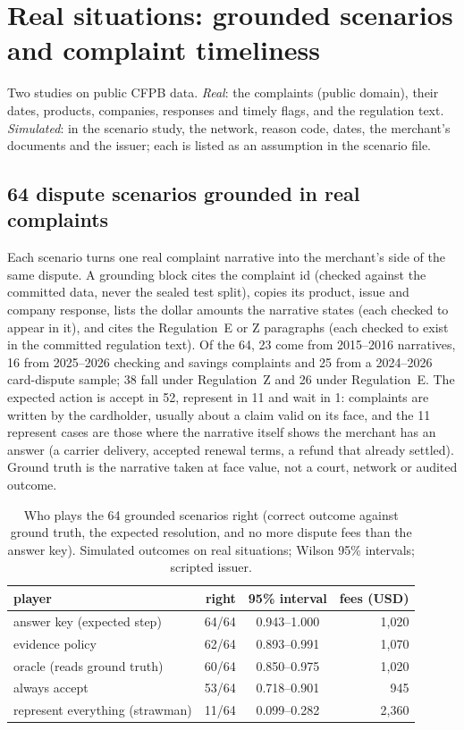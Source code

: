 \documentclass[11pt]{article}
\theoremstyle{definition}
\theoremstyle{remark}
\newcommand{\1}{\mathbf{1}}
\begin{document}
\section{Real situations: grounded scenarios and complaint timeliness}\label{sec:situations}

Two studies on public CFPB data. \emph{Real}: the complaints (public domain), their dates, products, companies, responses and timely flags, and the regulation text. \emph{Simulated}: in the scenario study, the network, reason code, dates, the merchant's documents and the issuer; each is listed as an assumption in the scenario file.

\subsection{64 dispute scenarios grounded in real complaints}

Each scenario turns one real complaint narrative into the merchant's side of the same dispute. A grounding block cites the complaint id (checked against the committed data, never the sealed test split), copies its product, issue and company response, lists the dollar amounts the narrative states (each checked to appear in it), and cites the Regulation~E or Z paragraphs (each checked to exist in the committed regulation text). Of the 64, 23 come from 2015--2016 narratives, 16 from 2025--2026 checking and savings complaints and 25 from a 2024--2026 card-dispute sample; 38 fall under Regulation~Z and 26 under Regulation~E. The expected action is accept in 52, represent in 11 and wait in 1: complaints are written by the cardholder, usually about a claim valid on its face, and the 11 represent cases are those where the narrative itself shows the merchant has an answer (a carrier delivery, accepted renewal terms, a refund that already settled). Ground truth is the narrative taken at face value, not a court, network or audited outcome.

\begin{table}[t]
\centering\small
\caption{Who plays the 64 grounded scenarios right (correct outcome against ground truth, the expected resolution, and no more dispute fees than the answer key). Simulated outcomes on real situations; Wilson 95\% intervals; scripted issuer.}\label{tab:scen}
\begin{tabular}{@{}lrcr@{}}
\toprule
player & right & 95\% interval & fees (USD)\\
\midrule
answer key (expected step) & 64/64 & 0.943--1.000 & 1{,}020\\
evidence policy & 62/64 & 0.893--0.991 & 1{,}070\\
oracle (reads ground truth) & 60/64 & 0.850--0.975 & 1{,}020\\
always accept & 53/64 & 0.718--0.901 & 945\\
represent everything (strawman) & 11/64 & 0.099--0.282 & 2{,}360\\
\bottomrule
\end{tabular}
\end{table}
\end{document}
